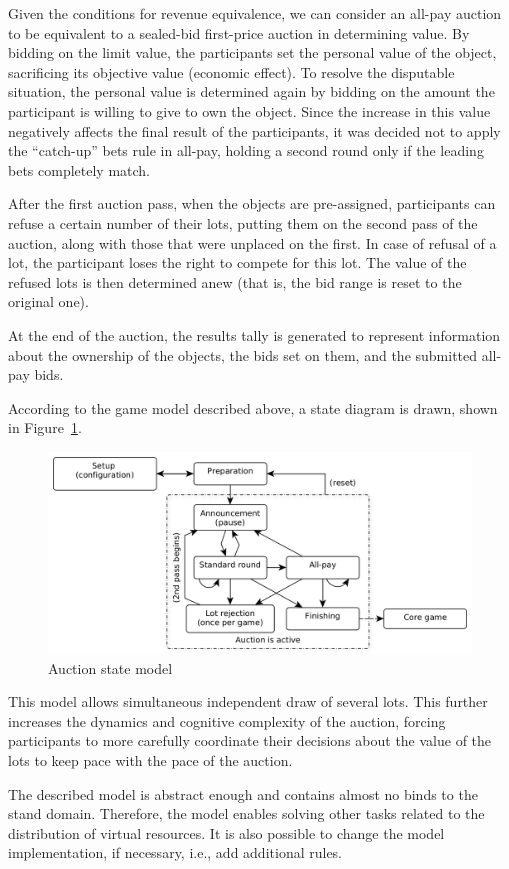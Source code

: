 \documentclass[
]{ceurart}
\begin{document}
Given the conditions for revenue equivalence, we can consider an all-pay auction to be equivalent to a sealed-bid first-price auction in determining value. By bidding on the limit value, the participants set the personal value of the object, sacrificing its objective value (economic effect). To resolve the disputable situation, the personal value is determined again by bidding on the amount the participant is willing to give to own the object. Since the increase in this value negatively affects the final result of the participants, it was decided not to apply the ``catch-up'' bets rule in all-pay, holding a second round only if the leading bets completely match.

After the first auction pass, when the objects are pre-assigned, participants can refuse a certain number of their lots, putting them on the second pass of the auction, along with those that were unplaced on the first. In case of refusal of a lot, the participant loses the right to compete for this lot. The value of the refused lots is then determined anew (that is, the bid range is reset to the original one).

At the end of the auction, the results tally is generated to represent information about the ownership of the objects, the bids set on them, and the submitted all-pay bids.

According to the game model described above, a state diagram is drawn, shown in Figure~\ref{fig:1}.


\begin{figure}
  \centering
  \includegraphics[width=0.7\linewidth]{pics/statechart.png}
  \caption{Auction state model}
  \label{fig:1}
\end{figure}

This model allows simultaneous independent draw of several lots. This further increases the dynamics and cognitive complexity of the auction, forcing participants to more carefully coordinate their decisions about the value of the lots to keep pace with the pace of the auction.

The described model is abstract enough and contains almost no binds to the stand domain. Therefore, the model enables solving other tasks related to the distribution of virtual resources. It is also possible to change the model implementation, if necessary, i.e., add additional rules.
\end{document}

